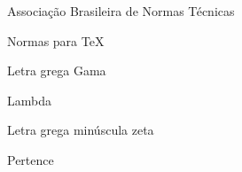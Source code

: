 \documentclass[
	12pt,					%
	openright,				%
	twoside,					%
	a4paper,					%
	english,					%
	brazil					%
	]{abntex2}
\begin{document}
\frenchspacing

\pretextual



\imprimirfolhaderosto*













\listoffigures*
\cleardoublepage

\listoftables*
\cleardoublepage

\begin{siglas}
  \item[ABNT] Associação Brasileira de Normas Técnicas
  \item[abnTeX] Normas para TeX
\end{siglas}

\begin{simbolos}
  \item[$ \Gamma $] Letra grega Gama
  \item[$ \Lambda $] Lambda
  \item[$ \zeta $] Letra grega minúscula zeta
  \item[$ \in $] Pertence
\end{simbolos}

\tableofcontents*
\cleardoublepage

\textual
\setcounter{page}{1}
\end{document}
